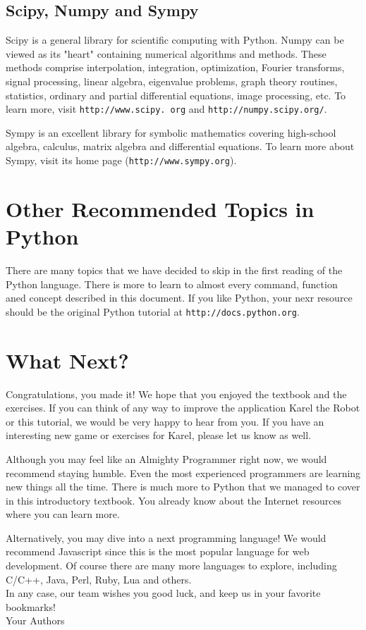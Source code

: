 \documentclass[article,A4,12pt]{llncs}
\begin{document}
\subsection{Scipy, Numpy and Sympy}

Scipy is a general library for scientific computing with 
Python. Numpy can be viewed as its "heart" containing numerical 
algorithms and methods. These methods comprise interpolation, 
integration, optimization, Fourier transforms, signal processing, 
linear algebra, eigenvalue problems, graph theory routines,
statistics, ordinary and partial differential equations,
image processing, etc. To learn more, visit 
{\tt http://www.scipy. org} and {\tt http://numpy.scipy.org/}. 

Sympy is an excellent library for symbolic mathematics covering high-school 
algebra, calculus, matrix algebra and differential equations. To learn more
about Sympy, visit its home page ({\tt http://www.sympy.org}).


\section{Other Recommended Topics in Python} \label{sec:adv}

There are many topics that we have decided to skip in the first reading 
of the Python language. There is more to learn to almost every command,
function aned concept described in this document. If you like Python,
your nexr resource should be the original Python tutorial at 
{\tt http://docs.python.org}. 






\section{What Next?}

Congratulations, you made it! We hope that you enjoyed the textbook and the 
exercises. If you can think of any way to improve the application Karel the 
Robot or this tutorial, we would be very happy to hear from you. If you 
have an interesting new game or exercises for Karel, please let us know as well. 

Although you may feel like an Almighty Programmer right now, we would
recommend staying humble. Even the most experienced programmers are
learning new things all the time. There is much more to Python that 
we managed to cover in this introductory textbook. You already know 
about the Internet resources where you can learn more.  

Alternatively, you may dive into a next programming language! We would 
recommend Javascript since this is the most popular language for web 
development. Of course there are many more languages to explore, including 
C/C++, Java, Perl, Ruby, Lua and others.\\

\noindent
In any case, our team wishes you good luck, and keep us in your 
favorite bookmarks! \\

\hbox{} \hfill{} Your Authors
\end{document}
